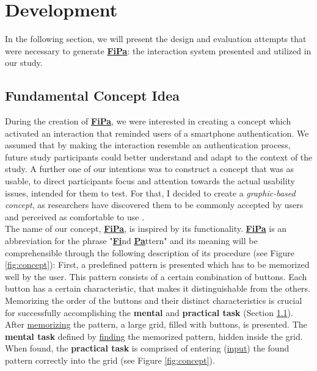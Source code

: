 \section{Development} \label{4.2}

In the following section, we will present the design and evaluation attempts that were necessary to generate \underline{\textbf{FiPa}}: the interaction system presented and utilized in our study. 

\subsection{Fundamental Concept Idea} \label{4.2.1}

During the creation of \underline{\textbf{FiPa}}, we were interested in creating a concept which activated an interaction that reminded users of a smartphone authentication. We assumed that by making the interaction resemble an authentication process, future study participants could better understand and adapt to the context of the study. A further one of our intentions was to construct a concept that was as usable, to direct participants focus and attention towards the actual usability issues, intended for them to test. For that, I decided to create a \textit{graphic-based concept}, as researchers have discovered them to be commonly accepted by users and perceived as comfortable to use \cite{PatternWild}. \\ 

The name of our concept, \underline{\textbf{FiPa}}, is inspired by its functionality. \underline{\textbf{FiPa}} is an abbreviation for the phrase "\underline{\textbf{Fi}}nd \underline{\textbf{Pa}}ttern" and its meaning will be comprehensible through the following description of its procedure (see Figure \ref{fig:concept}): First, a predefined pattern is presented which has to be memorized well by the user. This pattern consists of a certain combination of buttons. Each button has a certain characteristic, that makes it distinguishable from the others. Memorizing the order of the buttons and their distinct characteristics is crucial for successfully accomplishing the \textbf{mental} and \textbf{practical task} (Section \ref{4.2.1}). After \underline{memorizing} the pattern, a large grid, filled with buttons, is presented. The \textbf{mental task} defined by \underline{finding} the memorized pattern, hidden inside the grid. When found, the \textbf{practical task} is comprised of entering  (\underline{input}) the found pattern correctly into the grid (see Figure \ref{fig:concept}).\\

